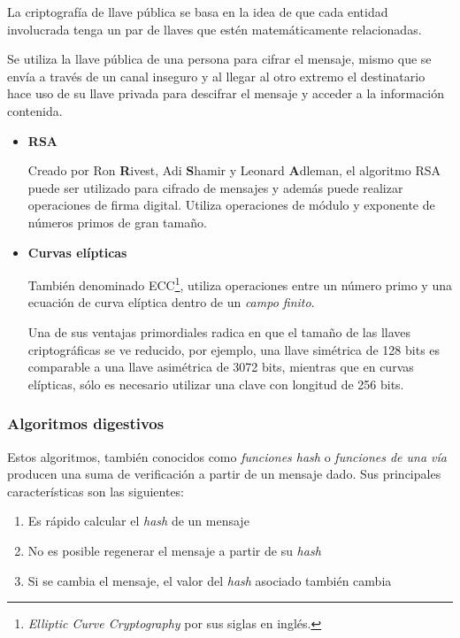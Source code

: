 La criptograf\'{i}a de llave p\'{u}blica se basa en la idea de que cada entidad involucrada tenga un par de llaves que est\'{e}n matem\'{a}ticamente relacionadas\cite{weisstein_rsa_????}.

Se utiliza la llave p\'{u}blica de una persona para cifrar el mensaje, mismo que se env\'{i}a a trav\'{e}s de un canal inseguro y al llegar al otro extremo el destinatario hace uso de su llave privada para descifrar el mensaje y acceder a la informaci\'{o}n contenida\cite{_yevgeny.pdf_????}.

      \begin{itemize}

        \item \textbf {RSA}

Creado por Ron \textbf{R}ivest, Adi \textbf{S}hamir y Leonard \textbf{A}dleman, el algoritmo \textsc{RSA} puede ser utilizado para cifrado de mensajes y adem\'{a}s puede realizar operaciones de firma digital. Utiliza operaciones de m\'{o}dulo y exponente de n\'{u}meros primos de gran tama\~{n}o\cite{weisstein_rsa_????}\cite{_slides12.dvi_????}.

        \item \textbf {Curvas el\'{i}pticas}

Tambi\'{e}n denominado \textsc{\gls{ECC}}\footnote{\emph{Elliptic Curve Cryptography} por sus siglas en ingl\'{e}s.}, utiliza operaciones entre un n\'{u}mero primo y una ecuaci\'{o}n de curva el\'{i}ptica dentro de un \emph{campo finito}\cite{_safecurves:_????}.

Una de sus ventajas primordiales radica en que el tama\~{n}o de las llaves criptogr\'{a}ficas se ve reducido, por ejemplo, una llave sim\'{e}trica de 128 bits es comparable a una llave asim\'{e}trica de 3072 bits, mientras que en curvas el\'{i}pticas, s\'{o}lo es necesario utilizar una clave con longitud de 256 bits.

      \end{itemize}

\newpage
    \subsubsection {Algoritmos digestivos}

Estos algoritmos, tambi\'{e}n conocidos como \emph{funciones hash} o \emph{funciones de una v\'{i}a} producen una suma de verificaci\'{o}n a partir de un mensaje dado. Sus principales caracter\'{i}sticas son las siguientes:

\begin{enumerate}
  \setlength{\itemsep}{0.5em}
  \item Es r\'{a}pido calcular el \emph{hash} de un mensaje
  \item No es posible regenerar el mensaje a partir de su \emph{hash}
  \item Si se cambia el mensaje, el valor del \emph{hash} asociado tambi\'{e}n cambia
\end{enumerate}

